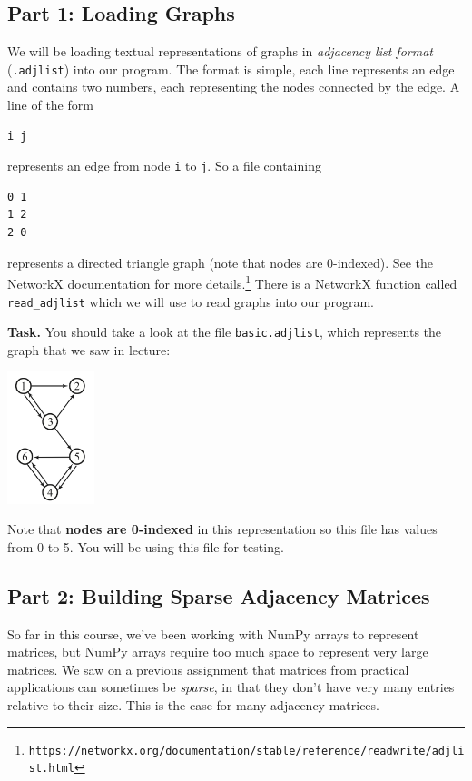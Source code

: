 \documentclass{article}
\theoremstyle{remark}
\begin{document}
\subsection*{Part 1: Loading Graphs}
We will be loading textual representations of graphs in \textit{adjacency list format} (\texttt{.adjlist}) into our program.
The format is simple, each line represents an edge and contains two numbers, each representing the nodes connected by the edge.
A line of the form
\begin{lstlisting}
i j
\end{lstlisting}
represents an edge from node \texttt{i} to \texttt{j}.
So a file containing
\begin{lstlisting}
0 1
1 2
2 0
\end{lstlisting}
represents a directed triangle graph (note that nodes are 0-indexed).
See the NetworkX documentation for more details.\footnote{\texttt{https://networkx.org/documentation/stable/reference/readwrite/adjlist.html}}
There is a NetworkX function called \texttt{read\_adjlist} which we will use to read graphs into our program.

\smallskip
\noindent
\textbf{Task.}
You should take a look at the file \texttt{basic.adjlist}, which represents the graph that we saw in lecture:
\begin{center}
  \includegraphics[width=1in]{deeper-pagerank-fig.jpg}
\end{center}
Note that \textbf{nodes are 0-indexed} in this representation so this file has values from 0 to 5.
You will be using this file for testing.

\subsection*{Part 2: Building Sparse Adjacency Matrices}

So far in this course, we've been working with NumPy arrays to represent matrices, but NumPy arrays require too much space to represent very large matrices.
We saw on a previous assignment that matrices from practical applications can sometimes be \textit{sparse}, in that they don't have very many entries relative to their size.
This is the case for many adjacency matrices.
\end{document}
